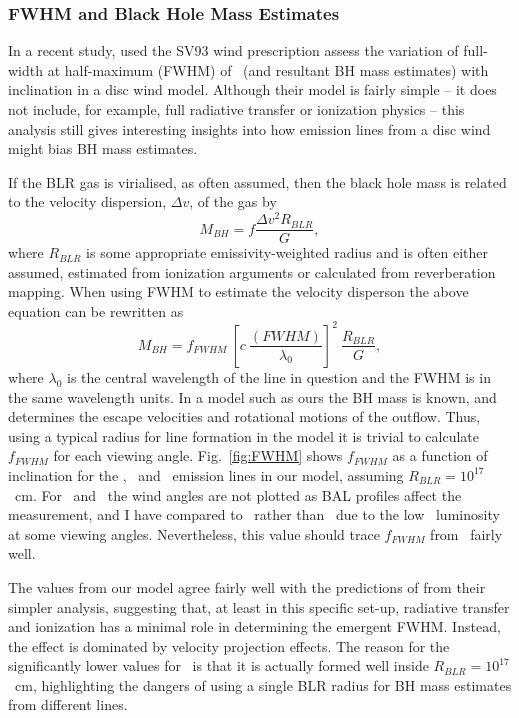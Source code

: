 \subsubsection{FWHM and Black Hole Mass Estimates}

In a recent study, \cite{yong2016} used the SV93 wind prescription
assess the variation of full-width at half-maximum (FWHM) of 
\hb\ (and resultant BH mass estimates)
with inclination in a disc wind model. 
Although their model is fairly simple -- 
it does not include, for example, full radiative transfer or ionization physics --
this analysis still gives interesting insights into how emission lines
from a disc wind might bias BH mass estimates.

If the BLR gas is virialised, as often assumed, then the black hole mass
is related to the velocity dispersion, $\Delta v$, of the gas by
\begin{equation}
M_{BH} = f \frac{\Delta v^2 R_{BLR}}{G},
\end{equation}
where $R_{BLR}$ is some appropriate emissivity-weighted radius and is often 
either assumed, estimated from ionization arguments or calculated from reverberation
mapping. When using FWHM to estimate the velocity disperson the above
equation can be rewritten as
\begin{equation}
M_{BH} = f_{FWHM}~\left[c~\frac{(FWHM)}{\lambda_0}\right]^2~\frac{R_{BLR}}{G},
\end{equation}
where $\lambda_0$ is the central wavelength of the line in question
and the FWHM is in the same wavelength units.
In a model such as ours the BH mass is known, and determines
the escape velocities and rotational motions of the outflow. Thus, 
using a typical radius for line formation in the model it is trivial to 
calculate $f_{FWHM}$ for each viewing angle. Fig.~\ref{fig:FWHM}
shows $f_{FWHM}$ as a function of inclination for the 
\civ, \mg\ and \ha\ emission lines in our model, 
assuming $R_{BLR}=10^{17}$~cm. 
For \civ\ and \mg\ the wind angles are not plotted as BAL profiles affect 
the measurement, and I have compared to \ha\ rather than \hb\ due to the
low \hb\ luminosity at some viewing angles. Nevertheless,
this value should trace $f_{FWHM}$ from \hb\ fairly well.

The values from our model agree fairly well with the predictions
of \cite{yong2016} from their simpler analysis, suggesting that,
at least in this specific set-up,
radiative transfer and ionization has a minimal role in determining
the emergent FWHM. Instead, the effect is dominated by velocity projection
effects. The reason for the significantly lower values for \mgii\ is that
it is actually formed well inside $R_{BLR}=10^{17}$~cm, highlighting
the dangers of using a single BLR radius for BH mass estimates
from different lines.

